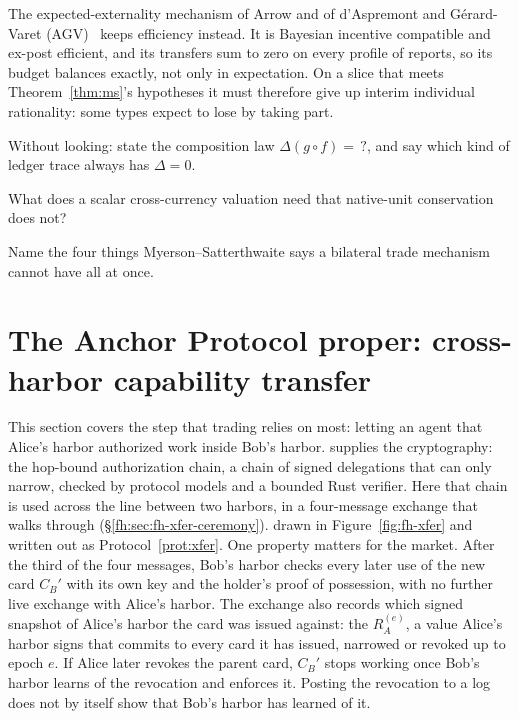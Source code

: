 \documentclass[11pt,a4paper]{article}
\theoremstyle{definition}
\theoremstyle{definition}
\theoremstyle{remark}
\begin{document}
The expected-externality mechanism of Arrow and of d'Aspremont and
G\'erard-Varet (AGV)~ keeps efficiency instead. It is
Bayesian incentive compatible and ex-post efficient, and its transfers sum
to zero on every profile of reports, so its budget balances exactly, not
only in expectation. On a slice that meets Theorem~\ref{thm:ms}'s
hypotheses it must therefore give up interim individual rationality: some
types expect to lose by taking part.

\pdexercisepointer*{\ref{ex:he-ms-assumptions}}{\ref{ex:he-phi-exposure-bound}}{\pageref{ex:he-ms-assumptions}}

\begin{pdrecitation}
\item Without looking: state the composition law $\Delta(g\circ f)=\,?$, and say which kind of ledger trace always has $\Delta=0$.
\item What does a scalar cross-currency valuation need that native-unit conservation does not?
\item Name the four things Myerson--Satterthwaite says a bilateral trade mechanism cannot have all at once.
\end{pdrecitation}

\section{The Anchor Protocol proper: cross-harbor capability transfer}\label{sec:anchor}\label{sec:fh-xfer}

This section covers the step that trading relies on most: letting an agent
that Alice's harbor authorized work inside Bob's harbor.
 supplies the cryptography: the
hop-bound authorization chain, a chain of signed delegations that can only
narrow, checked by protocol models and a bounded Rust verifier. Here that
chain is used across the line between two harbors, in a four-message exchange
\ifpdbook
that  walks through
(\S\ref{fh:sec:fh-xfer-ceremony}).
\else
%
drawn in Figure~\ref{fig:fh-xfer} and written out as Protocol~\ref{prot:xfer}.
\fi
One property matters for the market. After the third of the four messages,
Bob's harbor checks
every later use of the new card $C_B'$ with its own key and the holder's proof
of possession, with no further live
exchange with Alice's harbor. The exchange also records which signed snapshot of
Alice's harbor the card was issued against: the 
$R_A^{(e)}$, a value Alice's harbor signs that commits to every card it has
issued, narrowed or revoked up to epoch $e$. If Alice later revokes the parent
card, $C_B'$ stops working once Bob's harbor learns of the revocation and
enforces it. Posting the revocation to a log does not by itself show that
Bob's harbor has learned of it.
\end{document}

